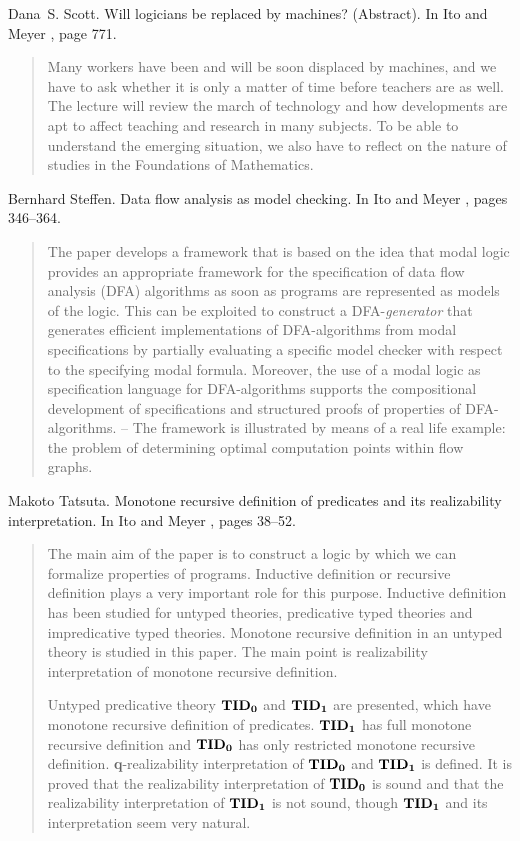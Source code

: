 \begin{thebibliography}{10}
Dana~S. Scott.
\newblock Will logicians be replaced by machines? ({Abstract}).
\newblock In Ito and Meyer \cite{TACS91}, page 771.
\begin{quotation}
Many workers have been and will be soon displaced by machines, and we have to
  ask whether it is only a matter of time before teachers are as well. The
  lecture will review the march of technology and how developments are apt to
  affect teaching and research in many subjects. To be able to understand the
  emerging situation, we also have to reflect on the nature of studies in the
  Foundations of Mathematics.
\end{quotation}

Bernhard Steffen.
\newblock Data flow analysis as model checking.
\newblock In Ito and Meyer \cite{TACS91}, pages 346--364.
\begin{quotation}
The paper develops a framework that is based on the idea that modal logic
  provides an appropriate framework for the specification of data flow analysis
  (DFA) algorithms as soon as programs are represented as models of the logic.
  This can be exploited to construct a DFA-{\em generator\/} that generates
  efficient implementations of DFA-algorithms from modal specifications by
  partially evaluating a specific model checker with respect to the specifying
  modal formula. Moreover, the use of a modal logic as specification language
  for DFA-algorithms supports the compositional development of specifications
  and structured proofs of properties of DFA-algorithms. -- The framework is
  illustrated by means of a real life example: the problem of determining
  optimal computation points within flow graphs.
\end{quotation}

Makoto Tatsuta.
\newblock Monotone recursive definition of predicates and its realizability
  interpretation.
\newblock In Ito and Meyer \cite{TACS91}, pages 38--52.
\begin{quotation}
The main aim of the paper is to construct a logic by which we can formalize
  properties of programs. Inductive definition or recursive definition plays a
  very important role for this purpose. Inductive definition has been studied
  for untyped theories, predicative typed theories and impredicative typed
  theories. Monotone recursive definition in an untyped theory is studied in
  this paper. The main point is realizability interpretation of monotone
  recursive definition. \par Untyped predicative theory ${\bf TID_0}$ and ${\bf
  TID_1}$ are presented, which have monotone recursive definition of
  predicates. ${\bf TID_1}$ has full monotone recursive definition and ${\bf
  TID_0}$ has only restricted monotone recursive definition. {\bf
  q}-realizability interpretation of ${\bf TID_0}$ and ${\bf TID_1}$ is
  defined. It is proved that the realizability interpretation of ${\bf TID_0}$
  is sound and that the realizability interpretation of ${\bf TID_1}$ is not
  sound, though ${\bf TID_1}$ and its interpretation seem very natural.
\end{quotation}


\end{thebibliography}
